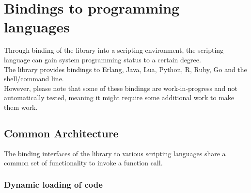 %
%
%
%

\newpage
\section{Bindings to programming languages}

Through binding of the  library into a scripting environment,
the scripting language can gain system programming status to a certain degree.\\
The  library provides bindings to Erlang\cite{Erlang}, Java\cite{Java},
Lua\cite{Lua}, Python\cite{Python}, R\cite{R}, Ruby\cite{Ruby}, Go\cite{Go} and the shell/command line.\\
However, please note that some of these bindings are work-in-progress and not
automatically tested, meaning it might require some additional work to make them
work.

\subsection{Common Architecture}

The binding interfaces of the  library to various scripting
languages share a common set of functionality to invoke a function call.

\subsubsection{Dynamic loading of code}

